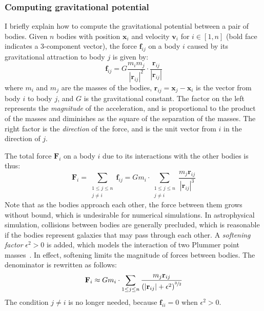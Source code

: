 \subsubsection{Computing gravitational potential}

I briefly explain how to compute the gravitational potential between a pair of
bodies. Given $n$ bodies with position $\mathbf{x}_i$ and velocity
$\mathbf{v}_i$ for $i \in [1,n]$ (bold face indicates a 3-component vector), the
force $\mathbf{f}_{ij}$ on a body $i$ caused by its gravitational attraction
to body $j$ is given by:
%
\begin{equation*}
    \mathbf{f}_{ij}
      = G \frac{m_i m_j}{\left|\mathbf{r}_{ij}\right|^2}
        \cdot
        \frac{\mathbf{r}_{ij}}{\left|\mathbf{r}_{ij}\right|}
\end{equation*}
%
where $m_i$ and $m_j$ are the masses of the bodies, $\mathbf{r}_{ij} =
\mathbf{x}_j - \mathbf{x}_i$ is the vector from body $i$ to body $j$, and $G$ is
the gravitational constant. The factor on the left represents the
\emph{magnitude} of the acceleration, and is proportional to the product of the
masses and diminishes as the square of the separation of the masses. The right
factor is the \emph{direction} of the force, and is the unit vector from $i$ in
the direction of $j$.

The total force $\mathbf{F}_i$ on a body $i$ due to its interactions with the
other bodies is thus:
%
\begin{equation*}
    \mathbf{F}_i
      = \sum_{\substack{1 \le j \le n\\j \ne i}} \mathbf{f}_{ij}
      = G m_i \cdot \sum_{\substack{1 \le j \le n\\j \ne i}}
            \frac{m_j \mathbf{r}_{ij}}{\left|\mathbf{r}_{ij}\right|^3}
\end{equation*}
%
Note that as the bodies approach each other, the force between them grows
without bound, which is undesirable for numerical simulations. In astrophysical
simulation, collisions between bodies are generally precluded, which is
reasonable if the bodies represent galaxies that may pass through each other. A
\emph{softening factor} $\epsilon^2 > 0$ is added, which models the interaction
of two Plummer point masses~\cite{Aarseth:2003uz,Dyer:1993bk}. In effect,
softening limits the magnitude of forces between bodies. The denominator is
rewritten as follows:
%
\begin{equation*}
    \mathbf{F}_i \approx G m_i \cdot \sum_{1 \le j \le n}
        \frac{m_j \mathbf{r}_{ij}}
             {\left( \left|\mathbf{r}_{ij}\right| + \epsilon^2 \right)^{\sfrac{3}{2}}}
\end{equation*}
%
The condition $j \ne i$ is no longer needed, because $\mathbf{f}_{ii} = 0$ when
$\epsilon^2 > 0$.

